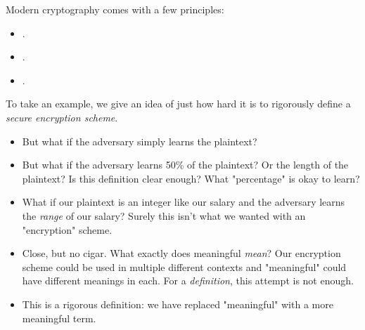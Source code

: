 Modern cryptography comes with a few principles:
\begin{itemize}
    \item {}.
    \item {}.
    \item {}.
\end{itemize}

\begin{example}
    To take an example, we give an idea of just how hard it is to rigorously define a \textit{secure encryption scheme}.
    \begin{itemize}
        \item {}

                But what if the adversary simply learns the plaintext?

        \item {}

                But what if the adversary learns 50\% of the plaintext? Or the length of the plaintext? Is this definition clear enough? What "percentage" is okay to learn?

        \item {}

                What if our plaintext is an integer like our salary and the adversary learns the \textit{range} of our salary? Surely this isn't what we wanted with an "encryption" scheme.

        \item {}

                Close, but no cigar. What exactly does meaningful \textit{mean}? Our encryption scheme could be used in multiple different contexts and "meaningful" could have different meanings in each. For a \textit{definition}, this attempt is not enough.

        \item {}

                This is a rigorous definition: we have replaced "meaningful" with a more meaningful term.
            
    \end{itemize}
\end{example}
